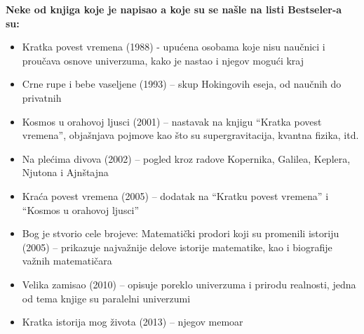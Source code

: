 \documentclass[a4paper, 12pt]{article}
\begin{document}
{\vspace{1cm}
\textbf{Neke od knjiga koje je napisao a koje su se našle na listi Bestseler-a su:} 
\begin{itemize}
 \item Kratka povest vremena (1988) - upućena osobama koje nisu naučnici i proučava osnove univerzuma, kako je nastao i njegov mogući kraj
 \item Crne rupe i bebe vaseljene (1993) – skup Hokingovih eseja, od naučnih do privatnih
 \item Kosmos u orahovoj ljusci (2001) – nastavak na knjigu “Kratka povest vremena”, objašnjava pojmove kao što su supergravitacija, kvantna fizika, itd.
 \item Na plećima divova (2002) – pogled kroz radove Kopernika, Galilea, Keplera, Njutona i Ajnštajna
 \item Kraća povest vremena (2005) – dodatak na “Kratku povest vremena” i “Kosmos u orahovoj ljusci”
 \item Bog je stvorio cele brojeve: Matematički prodori koji su promenili istoriju (2005) –  prikazuje najvažnije delove istorije matematike, kao i biografije važnih matematičara
 \item Velika zamisao (2010) – opisuje poreklo univerzuma i prirodu realnosti, jedna od tema knjige su paralelni univerzumi
 \item Kratka istorija mog života (2013) – njegov memoar
\end{itemize}
\cite{bestbooks}

}
\end{document}
